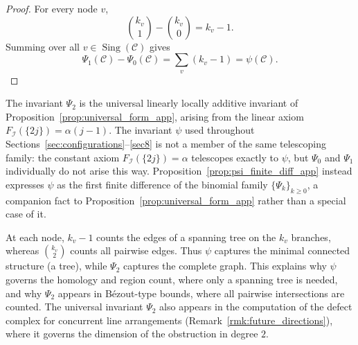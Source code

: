 \documentclass[article,11pt]{amsart} \numberwithin{equation}{section}
\numberwithin{equation}{section}
\begin{document}
{\begin{proof}
	For every node \(v\),
	\[
	\binom{k_v}{1}-\binom{k_v}{0}=k_v-1.
	\]
	Summing over all \(v\in\operatorname{Sing}(\mathcal C)\) gives
	\[
	\Psi_1(\mathcal C)-\Psi_0(\mathcal C)=\sum_v (k_v-1)=\psi(\mathcal C).
	\]
\end{proof}

\begin{rk}
	\label{rem:psi_vs_psi2_app}
	The invariant \(\Psi_2\) is the universal linearly locally additive invariant of Proposition~\ref{prop:universal_form_app}, arising from the linear axiom \(F_{\mathcal I}(\{2j\})=\alpha(j-1)\). The invariant \(\psi\) used throughout Sections~\ref{sec:configurations}--\ref{sec8} is not a member of the same telescoping family: the constant axiom \(F_{\mathcal I}(\{2j\})=\alpha\) telescopes exactly to \(\psi\), but \(\Psi_0\) and \(\Psi_1\) individually do not arise this way. Proposition~\ref{prop:psi_finite_diff_app} instead expresses \(\psi\) as the first finite difference of the binomial family \(\{\Psi_k\}_{k\ge 0}\), a companion fact to Proposition~\ref{prop:universal_form_app} rather than a special case of it.
	
	At each node, \(k_v-1\) counts the edges of a spanning tree on the \(k_v\) branches, whereas \(\binom{k_v}{2}\) counts all pairwise edges. Thus \(\psi\) captures the minimal connected structure (a tree), while \(\Psi_2\) captures the complete graph. This explains why \(\psi\) governs the homology and region count, where only a spanning tree is needed, and why \(\Psi_2\) appears in B\'ezout-type bounds, where all pairwise intersections are counted. The universal invariant \(\Psi_2\) also appears in the computation of the defect complex for concurrent line arrangements (Remark~\ref{rmk:future_directions}), where it governs the dimension of the obstruction in degree \(2\).
\end{rk}

}
\end{document}
